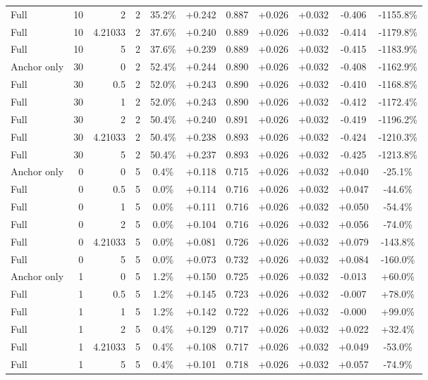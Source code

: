 \begin{table}[htbp]
\begin{tabular}{lrrrccccccc}
Full & 10 & 2 & 2 & 35.2\% & +0.242 & 0.887 & +0.026 & +0.032 & -0.406 & -1155.8\% \\
Full & 10 & 4.21033 & 2 & 37.6\% & +0.240 & 0.889 & +0.026 & +0.032 & -0.414 & -1179.8\% \\
Full & 10 & 5 & 2 & 37.6\% & +0.239 & 0.889 & +0.026 & +0.032 & -0.415 & -1183.9\% \\
Anchor only & 30 & 0 & 2 & 52.4\% & +0.244 & 0.890 & +0.026 & +0.032 & -0.408 & -1162.9\% \\
Full & 30 & 0.5 & 2 & 52.0\% & +0.243 & 0.890 & +0.026 & +0.032 & -0.410 & -1168.8\% \\
Full & 30 & 1 & 2 & 52.0\% & +0.243 & 0.890 & +0.026 & +0.032 & -0.412 & -1172.4\% \\
Full & 30 & 2 & 2 & 50.4\% & +0.240 & 0.891 & +0.026 & +0.032 & -0.419 & -1196.2\% \\
Full & 30 & 4.21033 & 2 & 50.4\% & +0.238 & 0.893 & +0.026 & +0.032 & -0.424 & -1210.3\% \\
Full & 30 & 5 & 2 & 50.4\% & +0.237 & 0.893 & +0.026 & +0.032 & -0.425 & -1213.8\% \\
Anchor only & 0 & 0 & 5 & 0.4\% & +0.118 & 0.715 & +0.026 & +0.032 & +0.040 & -25.1\% \\
Full & 0 & 0.5 & 5 & 0.0\% & +0.114 & 0.716 & +0.026 & +0.032 & +0.047 & -44.6\% \\
Full & 0 & 1 & 5 & 0.0\% & +0.111 & 0.716 & +0.026 & +0.032 & +0.050 & -54.4\% \\
Full & 0 & 2 & 5 & 0.0\% & +0.104 & 0.716 & +0.026 & +0.032 & +0.056 & -74.0\% \\
Full & 0 & 4.21033 & 5 & 0.0\% & +0.081 & 0.726 & +0.026 & +0.032 & +0.079 & -143.8\% \\
Full & 0 & 5 & 5 & 0.0\% & +0.073 & 0.732 & +0.026 & +0.032 & +0.084 & -160.0\% \\
Anchor only & 1 & 0 & 5 & 1.2\% & +0.150 & 0.725 & +0.026 & +0.032 & -0.013 & +60.0\% \\
Full & 1 & 0.5 & 5 & 1.2\% & +0.145 & 0.723 & +0.026 & +0.032 & -0.007 & +78.0\% \\
Full & 1 & 1 & 5 & 1.2\% & +0.142 & 0.722 & +0.026 & +0.032 & -0.000 & +99.0\% \\
Full & 1 & 2 & 5 & 0.4\% & +0.129 & 0.717 & +0.026 & +0.032 & +0.022 & +32.4\% \\
Full & 1 & 4.21033 & 5 & 0.4\% & +0.108 & 0.717 & +0.026 & +0.032 & +0.049 & -53.0\% \\
Full & 1 & 5 & 5 & 0.4\% & +0.101 & 0.718 & +0.026 & +0.032 & +0.057 & -74.9\% \\

\end{tabular}
\end{table}
